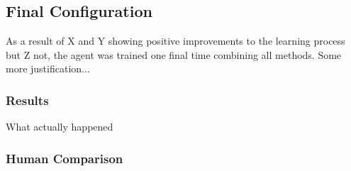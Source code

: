 
\subsection{Final Configuration}
\label{sec:findings-final}

As a result of X and Y showing positive improvements to the learning process
but Z not,
the agent was trained one final time combining all methods.
%
Some more justification...

\subsubsection*{Results}

What actually happened

\subsubsection*{Human Comparison}


